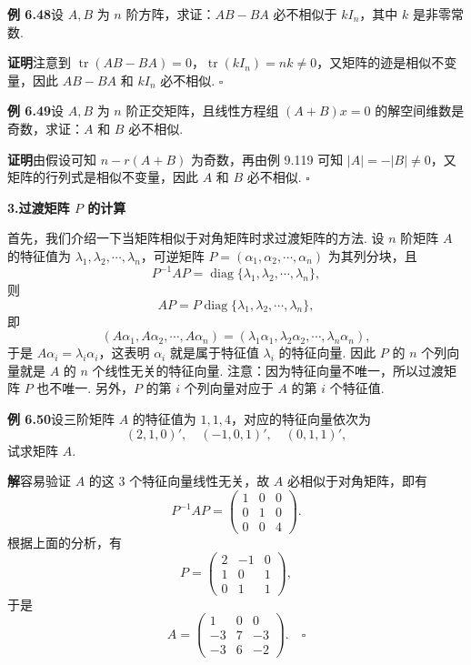 \documentclass[UTF8, 12pt, fontset=fandol, oneside]{ctexart}
\begin{document}
\noindent\textbf{例 6.48}\quad 设 $A,B$ 为 $n$ 阶方阵，求证：$AB-BA$ 必不相似于 $kI_n$，其中 $k$ 是非零常数.

\noindent\textbf{证明}\quad 注意到 $\operatorname{tr}(AB-BA)=0$，$\operatorname{tr}(kI_n)=nk\ne 0$，又矩阵的迹是相似不变量，因此 $AB-BA$ 和 $kI_n$ 必不相似. $\square$

\noindent\textbf{例 6.49}\quad 设 $A,B$ 为 $n$ 阶正交矩阵，且线性方程组 $(A+B)x=0$ 的解空间维数是奇数，求证：$A$ 和 $B$ 必不相似.

\noindent\textbf{证明}\quad 由假设可知 $n-r(A+B)$ 为奇数，再由例 9.119 可知 $|A|=-|B|\ne 0$，又矩阵的行列式是相似不变量，因此 $A$ 和 $B$ 必不相似. $\square$

\noindent\textbf{3.\quad 过渡矩阵 $P$ 的计算}

首先，我们介绍一下当矩阵相似于对角矩阵时求过渡矩阵的方法. 设 $n$ 阶矩阵 $A$ 的特征值为 $\lambda_1,\lambda_2,\cdots,\lambda_n$，可逆矩阵 $P=(\alpha_1,\alpha_2,\cdots,\alpha_n)$ 为其列分块，且
\[
P^{-1}AP=\operatorname{diag}\{\lambda_1,\lambda_2,\cdots,\lambda_n\},
\]
则
\[
AP=P\operatorname{diag}\{\lambda_1,\lambda_2,\cdots,\lambda_n\},
\]
即
\[
(A\alpha_1,A\alpha_2,\cdots,A\alpha_n)=(\lambda_1\alpha_1,\lambda_2\alpha_2,\cdots,\lambda_n\alpha_n),
\]
于是 $A\alpha_i=\lambda_i\alpha_i$，这表明 $\alpha_i$ 就是属于特征值 $\lambda_i$ 的特征向量. 因此 $P$ 的 $n$ 个列向量就是 $A$ 的 $n$ 个线性无关的特征向量. 注意：因为特征向量不唯一，所以过渡矩阵 $P$ 也不唯一. 另外，$P$ 的第 $i$ 个列向量对应于 $A$ 的第 $i$ 个特征值.

\noindent\textbf{例 6.50}\quad 设三阶矩阵 $A$ 的特征值为 $1,1,4$，对应的特征向量依次为
\[
(2,1,0)',\quad (-1,0,1)',\quad (0,1,1)',
\]
试求矩阵 $A$.

\noindent\textbf{解}\quad 容易验证 $A$ 的这 3 个特征向量线性无关，故 $A$ 必相似于对角矩阵，即有
\[
P^{-1}AP=\left(\begin{array}{ccc}
1 & 0 & 0\\
0 & 1 & 0\\
0 & 0 & 4
\end{array}\right).
\]
根据上面的分析，有
\[
P=\left(\begin{array}{ccc}
2 & -1 & 0\\
1 & 0 & 1\\
0 & 1 & 1
\end{array}\right),
\]
于是
\[
A=\left(\begin{array}{ccc}
1 & 0 & 0\\
-3 & 7 & -3\\
-3 & 6 & -2
\end{array}\right). \quad \square
\]
\end{document}
